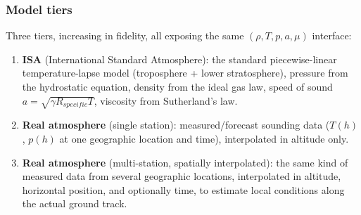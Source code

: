 \subsubsection{Model tiers}\label{sec:atmos_tiers}
Three tiers, increasing in fidelity, all exposing the same $(\rho, T, p, a, \mu)$ interface:
\begin{enumerate}
    \item \textbf{ISA} (International Standard Atmosphere): the standard piecewise-linear
    temperature-lapse model (troposphere + lower stratosphere), pressure from the hydrostatic
    equation, density from the ideal gas law, speed of sound $a=\sqrt{\gamma R_{specific}T}$,
    viscosity from Sutherland's law.
    \item \textbf{Real atmosphere} (single station): measured/forecast sounding data ($T(h)$,
    $p(h)$ at one geographic location and time), interpolated in altitude only.
    \item \textbf{Real atmosphere} (multi-station, spatially interpolated): the same kind of
    measured data from several geographic locations, interpolated in altitude, horizontal
    position, and optionally time, to estimate local conditions along the actual ground track.
\end{enumerate}

